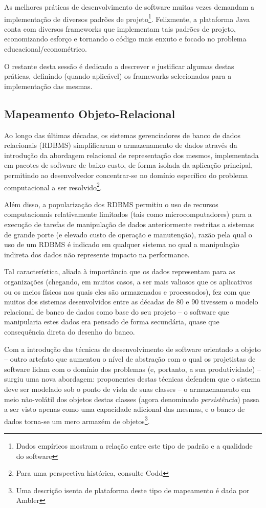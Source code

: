 \documentclass{abnt}
\begin{document}
As melhores práticas de desenvolvimento de software muitas vezes demandam a implementação de diversos padrões de projeto\footnote{Dados empíricos mostram\cite{IeeeExperience} a relação entre este tipo de padrão e a qualidade do software}. Felizmente, a plataforma Java conta com diversos frameworks que implementam tais padrões de projeto, economizando esforço e tornando o código mais enxuto e focado no problema educacional/econométrico.

O restante desta sessão é dedicado a descrever e justificar algumas destas práticas, definindo (quando aplicável) os frameworks selecionados para a implementação das mesmas.

\subsection{Mapeamento Objeto-Relacional}

Ao longo das últimas décadas, os sistemas gerenciadores de banco de dados relacionais (RDBMS)  simplificaram o armazenamento de dados através da introdução da abordagem relacional de representação dos mesmos, implementada em pacotes de software de baixo custo, de forma isolada da aplicação principal, permitindo ao desenvolvedor concentrar-se no domínio específico do problema computacional a ser resolvido\footnote{Para uma perspectiva histórica, consulte Codd\cite{Codd1970}}.

Além disso, a popularização dos RDBMS permitiu o uso de recursos computacionais relativamente limitados (tais como microcomputadores) para a execução de tarefas de manipulação de dados anteriormente restritas a sistemas de grande porte (e elevado custo de operação e manutenção), razão pela qual o uso de um RDBMS é indicado em qualquer sistema no qual a manipulação indireta dos dados não represente impacto na performance.

Tal característica, aliada à importância que os dados representam para as organizações (chegando, em muitos casos, a ser mais valiosos que os aplicativos ou os meios físicos nos quais eles são armazenados e processados), fez com que muitos dos sistemas desenvolvidos entre as décadas de 80 e 90 tivessem o modelo relacional de banco de dados como base do seu projeto – o software que manipularia estes dados era pensado de forma secundária, quase que consequência direta do desenho do banco.

Com a introdução das técnicas de desenvolvimento de software orientado a objeto – outro artefato que aumentou o nível de abstração com o qual os projetistas de software lidam com o domínio dos problemas (e, portanto, a sua produtividade) – surgiu uma nova abordagem: proponentes destas técnicas defendem que o sistema deve ser modelado sob o ponto de vista de suas classes – o armazenamento em meio não-volátil dos objetos destas classes (agora denominado \textit{persistência}) passa a ser visto apenas como uma capacidade adicional das mesmas, e o banco de dados torna-se um mero armazém de objetos\footnote{Uma descrição isenta de plataforma deste tipo de mapeamento é dada por Ambler\cite{web:ambler}}.
\end{document}
